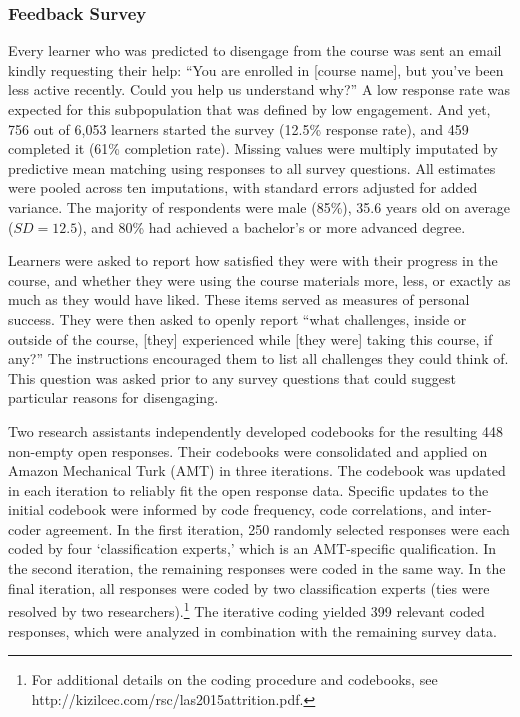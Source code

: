 \documentclass{sigchi}\usepackage[]{graphicx}\usepackage[]{color}
\begin{document}
\subsubsection{Feedback Survey}

Every learner who was predicted to disengage from the course was sent an email kindly requesting their help: ``You are enrolled in [course name], but you've been less active recently. Could you help us understand why?'' A low response rate was expected for this subpopulation that was defined by low engagement. And yet, 756 out of 6,053 learners started the survey (12.5\% response rate), and 459 completed it (61\% completion rate). Missing values were multiply imputated by predictive mean matching using responses to all survey questions. All estimates were pooled across ten imputations, with standard errors adjusted for added variance. The majority of respondents were male (85\%), 35.6 years old on average ($SD=12.5$), and 80\% had achieved a bachelor's or more advanced degree.

Learners were asked to report how satisfied they were with their progress in the course, and whether they were using the course materials more, less, or exactly as much as they would have liked. These items served as measures of personal success. They were then asked to openly report ``what challenges, inside or outside of the course, [they] experienced while [they were] taking this course, if any?'' The instructions encouraged them to list all challenges they could think of. This question was asked prior to any survey questions that could suggest particular reasons for disengaging.

Two research assistants independently developed codebooks for the resulting 448 non-empty open responses. Their codebooks were consolidated and applied on Amazon Mechanical Turk (AMT) in three iterations. The codebook was updated in each iteration to reliably fit the open response data. Specific updates to the initial codebook were informed by code frequency, code correlations, and inter-coder agreement. In the first iteration, 250 randomly selected responses were each coded by four `classification experts,' which is an AMT-specific qualification. In the second iteration, the remaining responses were coded in the same way. In the final iteration, all responses were coded by two classification experts (ties were resolved by two researchers).\footnote{For additional details on the coding procedure and codebooks, see http://kizilcec.com/rsc/las2015attrition.pdf.} The iterative coding yielded 399 relevant coded responses, which were analyzed in combination with the remaining survey data.
\end{document}
